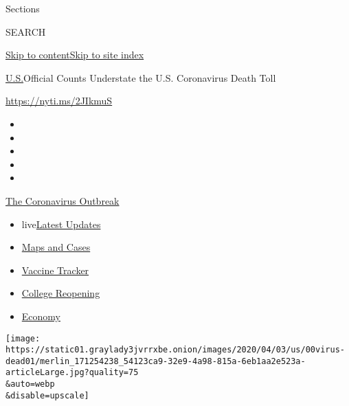 Sections

SEARCH

\protect\hyperlink{site-content}{Skip to
content}\protect\hyperlink{site-index}{Skip to site index}

\href{/section/us}{U.S.}\textbar{}Official Counts Understate the U.S.
Coronavirus Death Toll

\url{https://nyti.ms/2JIkmuS}

\begin{itemize}
\item
\item
\item
\item
\item
\end{itemize}

\href{https://www.nytimes3xbfgragh.onion/news-event/coronavirus?action=click\&pgtype=Article\&state=default\&region=TOP_BANNER\&context=storylines_menu}{The
Coronavirus Outbreak}

\begin{itemize}
\tightlist
\item
  live\href{https://www.nytimes3xbfgragh.onion/2020/08/04/world/coronavirus-cases.html?action=click\&pgtype=Article\&state=default\&region=TOP_BANNER\&context=storylines_menu}{Latest
  Updates}
\item
  \href{https://www.nytimes3xbfgragh.onion/interactive/2020/us/coronavirus-us-cases.html?action=click\&pgtype=Article\&state=default\&region=TOP_BANNER\&context=storylines_menu}{Maps
  and Cases}
\item
  \href{https://www.nytimes3xbfgragh.onion/interactive/2020/science/coronavirus-vaccine-tracker.html?action=click\&pgtype=Article\&state=default\&region=TOP_BANNER\&context=storylines_menu}{Vaccine
  Tracker}
\item
  \href{https://www.nytimes3xbfgragh.onion/2020/08/02/us/covid-college-reopening.html?action=click\&pgtype=Article\&state=default\&region=TOP_BANNER\&context=storylines_menu}{College
  Reopening}
\item
  \href{https://www.nytimes3xbfgragh.onion/live/2020/08/04/business/stock-market-today-coronavirus?action=click\&pgtype=Article\&state=default\&region=TOP_BANNER\&context=storylines_menu}{Economy}
\end{itemize}

\texttt{[image: https://static01.graylady3jvrrxbe.onion/images/2020/04/03/us/00virus-dead01/merlin\_171254238\_54123ca9-32e9-4a98-815a-6eb1aa2e523a-articleLarge.jpg?quality=75\\\&auto=webp\\\&disable=upscale]}

